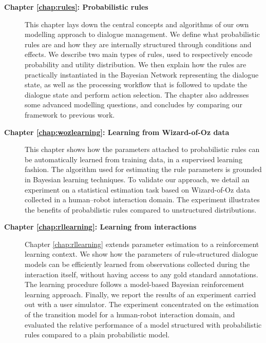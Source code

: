 \begin{description}
  \item[\textbf{Chapter \ref{chap:rules}: Probabilistic rules}] \hfill \vspace{2mm}
 
  This chapter lays down the central concepts and algorithms of our own modelling approach to dialogue management. We define what probabilistic rules are and how they are internally structured through conditions and effects.  We describe two main types of rules, used to respectively encode probability and utility distribution. We then explain how the rules are practically instantiated in the Bayesian Network representing the dialogue state, as well as the processing workflow that is followed to update the dialogue state and perform action selection. The chapter also addresses some advanced modelling questions, and concludes by comparing our framework to previous work. \vspace{2mm}
  
  \item[\textbf{Chapter \ref{chap:wozlearning}: Learning from Wizard-of-Oz data}] \hfill  \vspace{2mm}
  
 This chapter shows how the parameters attached to probabilistic rules can be automatically learned from training data, in a supervised learning fashion. The algorithm used for estimating the rule parameters is grounded in Bayesian learning techniques.  To validate our approach, we detail an experiment on a statistical estimation task based on Wizard-of-Oz data collected in a human--robot interaction domain.  The experiment illustrates the benefits of probabilistic rules compared to unstructured distributions.  \vspace{2mm}

\item [\textbf{Chapter \ref{chap:rllearning}: Learning from interactions}] \hfill  \vspace{2mm}

Chapter \ref{chap:rllearning} extends parameter estimation to a reinforcement learning context.  We show how the parameters of rule-structured dialogue models can be efficiently learned from observations collected during the interaction itself, without having access to any gold standard annotations.  The learning procedure follows a model-based Bayesian reinforcement learning approach. Finally, we report the results of an experiment carried out with a user simulator.  The experiment concentrated on the estimation of the transition model for a human-robot interaction domain, and evaluated the relative performance of a model structured with probabilistic rules compared to a plain probabilistic model.   \vspace{2mm}



\end{description}
